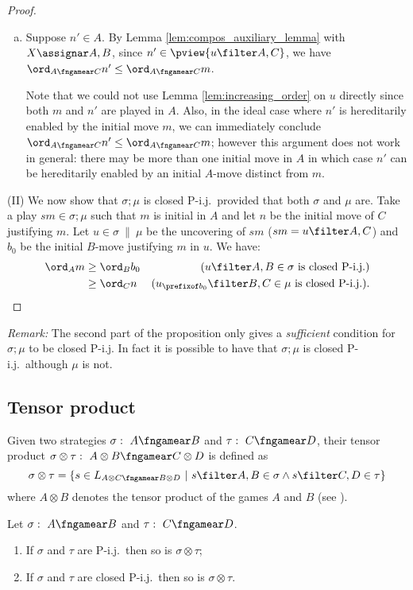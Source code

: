 \begin{proof}
\begin{enumerate}[1)]
\begin{itemize}[-]
\begin{enumerate}[a.]
            \item Suppose $n'\in A$.
By Lemma \ref{lem:compos_auxiliary_lemma} with $X \assignar A,B$, since $n' \in \pview{u \filter A,C}$, we have $\ord_{A\fngamear C} n' \leq \ord_{A\fngamear C} m$.
\smallskip

        Note that we could not use Lemma \ref{lem:increasing_order} on $u$ directly since both $m$ and $n'$ are played in $A$. Also, in the ideal case where $n'$ is hereditarily enabled by the initial move $m$, we can immediately conclude $\ord_{A\fngamear C} n' \leq \ord_{A\fngamear C} m$; however this argument does not work in general: there may be more than one initial move in $A$ in which case $n'$ can be hereditarily enabled by an initial $A$-move distinct from $m$.
            \end{enumerate}
        \end{itemize}

    \end{enumerate}

\noindent (II) We now show that $\sigma;\mu$ is closed P-i.j.\
provided that both $\sigma$ and $\mu$ are. Take a play $s m \in
\sigma ; \mu$ such that $m$ is initial in $A$ and let $n$ be the
initial move of $C$ justifying $m$. Let $u \in \sigma \ \|\ \mu$ be
the uncovering of $s m$ ($s m = u \filter A,C$) and $b_0$ be the
initial $B$-move justifying $m$ in $u$.
 We have:
\begin{align*}
\ord_A m & \geq \ord_B b_0 & \mbox{($u \filter A,B \in \sigma$ is closed P-i.j.)} \\
 & \geq \ord_C n & \mbox{($u_{\prefixof b_0} \filter B,C \in \mu $ is closed P-i.j.)}.
\end{align*}
\end{proof}

{\it Remark:} The second part of the proposition only gives a
\emph{sufficient} condition for $\sigma ; \mu$ to be closed P-i.j.
In fact it is possible to have that $\sigma ; \mu$ is closed P-i.j.\
although $\mu$ is not.


\subsection{Tensor product}

 Given two strategies $\sigma :\ A
\fngamear B$  and $\tau :\ C\fngamear D$, their tensor product
$\sigma \otimes \tau :\ A\otimes B \fngamear C\otimes D$ is defined
as
$$\sigma \otimes \tau = \{ s \in L_{A\otimes C \fngamear B\otimes
D} \ | \ s \filter A,B \in \sigma \wedge s \filter C,D \in \tau \} $$
 where $A\otimes B$ denotes the tensor product of the games $A$ and $B$ (see \cite{abramsky:game-semantics-tutorial}).
\begin{proposition}
Let $\sigma :\ A \fngamear B$  and $\tau :\ C\fngamear D$.
\begin{enumerate}
\item If $\sigma$ and $\tau$ are P-i.j.\
then so is $\sigma \otimes \tau$;
\item If $\sigma$ and $\tau$ are closed P-i.j.\ then so is $\sigma \otimes \tau$.
\end{enumerate}
\end{proposition}

